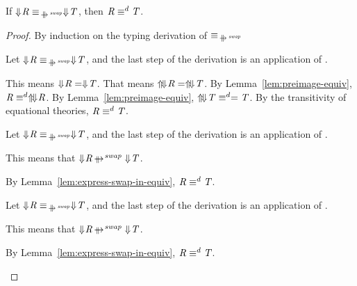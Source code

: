 \documentclass[numbers,10pt,preprint\ifanon ,nocopyrightspace\fi]{sigplanconf}
\begin{document}
\begin{lemma}
  \label{lem:express-equiv-swap-in-equiv}
  If $\ToDNFRegexOf{\Regex} \EquivalenceOf{\ParallelRewriteSwap}
  \ToDNFRegexOf{\RegexAlt}$, then
  $\mathit{R} \equiv^d \mathit{T}$.
\end{lemma}
\begin{proof}
  By induction on the typing derivation of
  $\EquivalenceOf{\ParallelRewriteSwap}$
  \begin{case}[\ReflexivityRule{}]
    Let $\ToDNFRegexOf{\Regex} \EquivalenceOf{\ParallelRewriteSwap}
    \ToDNFRegexOf{\RegexAlt}$, and the last step of the derivation is an
    application of \ReflexivityRule{}.

    This means $\Downarrow\mkern-4mu \mathit{R} = \Downarrow\mkern-4mu \mathit{T}$.  That means
    $\Uparrow\mkern-4mu \Downarrow\mkern-4mu \mathit{R} = \Uparrow\mkern-4mu \Downarrow\mkern-4mu \mathit{T}$.
    By Lemma~\ref{lem:preimage-equiv},
    $\mathit{R} \equiv^d \Uparrow\mkern-4mu \Downarrow\mkern-4mu \mathit{R}$.
    By Lemma~\ref{lem:preimage-equiv},
    $\Uparrow\mkern-4mu \Downarrow\mkern-4mu \mathit{T} \equiv^d = \mathit{T}$.
    By the transitivity of equational theories,
    $\mathit{R} \equiv^d \mathit{T}$.
  \end{case}

  \begin{case}[\BaseRule{}]
    Let $\ToDNFRegexOf{\Regex} \EquivalenceOf{\ParallelRewriteSwap}
    \ToDNFRegexOf{\RegexAlt}$, and the last step of the derivation is an
    application of \BaseRule{}.

    This means that $\ToDNFRegexOf{\Regex} \ParallelRewriteSwap
    \ToDNFRegexOf{\RegexAlt}$.

    By Lemma~\ref{lem:express-swap-in-equiv},
    $\mathit{R} \equiv^d \mathit{T}$.
  \end{case}

  \begin{case}[\SymmetryRule{}]
    Let $\ToDNFRegexOf{\Regex} \EquivalenceOf{\ParallelRewriteSwap}
    \ToDNFRegexOf{\RegexAlt}$, and the last step of the derivation is an
    application of \BaseRule{}.

    This means that $\ToDNFRegexOf{\Regex} \ParallelRewriteSwap
    \ToDNFRegexOf{\RegexAlt}$.

    By Lemma~\ref{lem:express-swap-in-equiv},
    $\mathit{R} \equiv^d \mathit{T}$.
  \end{case}
\end{proof}
\end{document}
